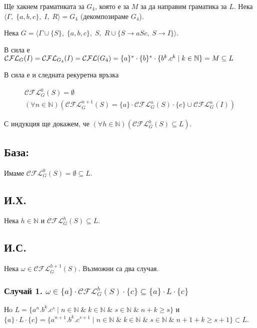 \documentclass[12pt]{article}
\begin{document}
Ще хакнем граматиката за \(G_4\), която е за \(M\) за да направим граматика за \(L\).
Нека \(\langle \Gamma,\; \{a, b, c\},\; I,\; R \rangle = G_4\) (декомпозираме \(G_4\)).

Нека \(G = \langle \Gamma \cup \{S\},\; \{a, b, c\},\; S,\; R \cup \{S \to aSc,\; S \to I\} \rangle\).

В сила е \(\mathcal{CFL}_G(I) = \mathcal{CFL}_{G_4}(I) = \mathcal{CFL}(G_4) = \\ \{a\}^* \cdot \{b\}^* \cdot \{b^k.c^k \mid k \in \mathbb{N}\} = M \subseteq L\)

В сила е и следната рекуретна връзка

\begin{align*}
    \mathcal{CFL}_{G}^0(S) = \emptyset \\
    (\forall n \in \mathbb N)(\mathcal{CFL}_{G}^{n + 1}(S) = \{a\} \cdot \mathcal{CFL}_{G}^n(S) \cdot \{c\} \cup \mathcal{CFL}_{G}^n(I))
\end{align*}

С индукция ще докажем, че \((\forall h \in \mathbb{N})(\mathcal{CFL}_{G}^h(S) \subseteq L)\).

\subsection*{База:}
Имаме \(\mathcal{CFL}_G^0(S) = \emptyset \subseteq L\).

\subsection*{И.Х.}
Нека \(h \in \mathbb{N}\) и \(\mathcal{CFL}_{G}^h(S) \subseteq L\).

\subsection*{И.С.}
Нека \(\omega \in \mathcal{CFL}_{G}^{h + 1}(S)\). Възможни са два случая.

\subsubsection*{Случай 1. \(\omega \in \{a\} \cdot \mathcal{CFL}_{G}^h(S) \cdot \{c\} \subseteq \{a\} \cdot L \cdot \{c\}\)}

Нo \(L = \{a^n.b^k.c^s \mid n \in \mathbb{N} \;\&\; k \in \mathbb{N} \;\&\; s \in \mathbb{N} \;\&\; n + k \geq s\}\)
и \(\{a\} \cdot L \cdot \{c\} = \{a^{n + 1}.b^k.c^{s + 1} \mid n \in \mathbb{N} \;\&\; k \in \mathbb{N} \;\&\; s \in \mathbb{N} \;\&\; n + 1 + k \geq s + 1\} \subset L\).
\end{document}
